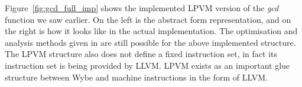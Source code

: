Figure~\ref{fig:gcd_full_imp} shows the implemented LPVM version of the
\textit{gcd} function we saw earlier. On the left is the abstract form
representation, and on the right is how it looks like in the actual
implementation. The optimisation and analysis methods given in \cite{lpvm2015}
are still possible for the above implemented structure. The LPVM structure also
does not define a fixed instruction set, in fact its instruction set is being
provided by LLVM. LPVM exists as an important glue structure between Wybe and
machine instructions in the form of LLVM.


